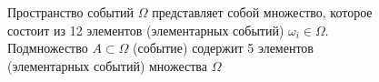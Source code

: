 \begin{figure}
\centering



\caption{Пространство событий $\Omega$ представляет собой множество,
  которое состоит из 12 элементов (элементарных событий) 
$\omega_i \in \Omega$. Подмножество $A \subset \Omega$ (событие)
  содержит 5 элементов (элементарных событий) множества $\Omega$}
\label{figAddProbabilityDefinition}
\end{figure}
